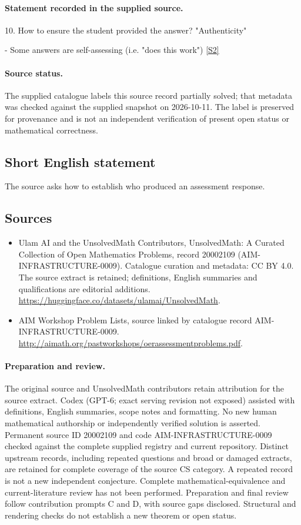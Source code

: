 \documentclass[11pt]{article}
\begin{document}
\paragraph{Statement recorded in the supplied source.}
10. How to ensure the student provided the answer? "Authenticity"

- Some answers are self-assessing (i.e. "does this work") \href{http://aimath.org/pastworkshops/oerassessmentproblems.pdf}{[S2]}
\paragraph{Source status.}
The supplied catalogue labels this source record partially solved; that metadata was checked against the supplied snapshot on 2026-10-11. The label is preserved for provenance and is not an independent verification of present open status or mathematical correctness.
\subsection{Short English statement}
The source asks how to establish who produced an assessment response.
\subsection{Sources}
\begin{itemize}
\item[S1] Ulam AI and the UnsolvedMath Contributors, UnsolvedMath: A Curated Collection of Open Mathematics Problems, record 20002109 (AIM-INFRASTRUCTURE-0009). Catalogue curation and metadata: CC BY 4.0. The source extract is retained; definitions, English summaries and qualifications are editorial additions.
\url{https://huggingface.co/datasets/ulamai/UnsolvedMath}.
\item[S2] AIM Workshop Problem Lists, source linked by catalogue record AIM-INFRASTRUCTURE-0009.
\url{http://aimath.org/pastworkshops/oerassessmentproblems.pdf}.
\end{itemize}
\paragraph{Preparation and review.}
The original source and UnsolvedMath contributors retain attribution for the source extract. Codex (GPT-6; exact serving revision not exposed) assisted with definitions, English summaries, scope notes and formatting. No new human mathematical authorship or independently verified solution is asserted. Permanent source ID 20002109 and code AIM-INFRASTRUCTURE-0009 checked against the complete supplied registry and current repository. Distinct upstream records, including repeated questions and broad or damaged extracts, are retained for complete coverage of the source CS category. A repeated record is not a new independent conjecture. Complete mathematical-equivalence and current-literature review has not been performed. Preparation and final review follow contribution prompts C and D, with source gaps disclosed. Structural and rendering checks do not establish a new theorem or open status.
\label{end:20002109}
\end{document}
